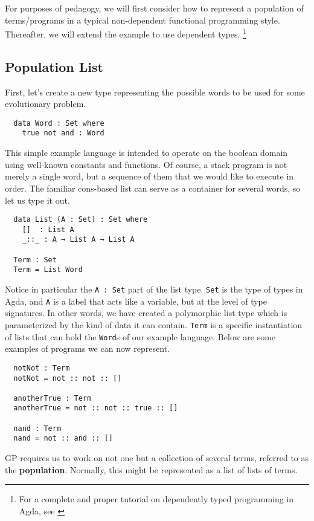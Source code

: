 \documentclass[runningheads,a4paper]{llncs}
\begin{document}
For purposes of pedagogy, we will first consider how to represent a
population of terms/programs in a typical non-dependent functional
programming style. Thereafter, we will extend the example to use
dependent types.
\footnote{For a complete and proper tutorial on dependently typed programming in Agda, see \cite{norell:agdatut}}

\subsection{Population List}

First, let's create a new type representing the possible words to be
used for some evolutionary problem.

\begin{verbatim}
  data Word : Set where
    true not and : Word
\end{verbatim}

This simple example language is intended to operate on the boolean domain using
well-known constants and functions. Of course, a stack program is not
merely a single word, but a sequence of them that we would like to
execute in order. The familiar cons-based list can serve as a
container for several words, so let us type it out.

\begin{verbatim}
  data List (A : Set) : Set where
    []  : List A
    _::_ : A → List A → List A

  Term : Set
  Term = List Word
\end{verbatim}

Notice in particular the \texttt{A : Set} part of the list
type. \texttt{Set} is the type of types in Agda, and \texttt{A} is
a label that acts like a variable, but at the level of type
signatures. In other words, we have created a polymorphic list type
which is parameterized by the kind of data it can
contain. \texttt{Term} is a specific instantiation of lists that can
hold the \texttt{Word}s of our example language. Below are some
examples of programs we can now represent.

\begin{verbatim}
  notNot : Term
  notNot = not :: not :: []

  anotherTrue : Term
  anotherTrue = not :: not :: true :: []

  nand : Term
  nand = not :: and :: []
\end{verbatim}

GP requires us to work on not one but a collection of several terms,
referred to as the \textbf{population}. Normally, this might be
represented as a list of lists of terms.
\end{document}
